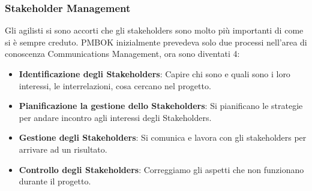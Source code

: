 \subsubsection{Stakeholder Management}
Gli agilisti si sono accorti che gli stakeholders sono molto più importanti di come si è sempre creduto.
PMBOK inizialmente prevedeva solo due processi nell'area di conoscenza Communications Management, ora sono diventati 4:
\begin{itemize}
	\item \textbf{Identificazione degli Stakeholders}: Capire chi sono e quali sono i loro interessi, le interrelazioni, cosa cercano nel progetto.
	\item \textbf{Pianificazione la gestione dello Stakeholders}: Si pianificano le strategie per andare incontro agli interessi degli Stakeholders.
	\item \textbf{Gestione degli Stakeholders}: Si comunica e lavora con gli stakeholders per arrivare ad un risultato.
	\item \textbf{Controllo degli Stakeholders}: Correggiamo gli aspetti che non funzionano durante il progetto.
\end{itemize}
